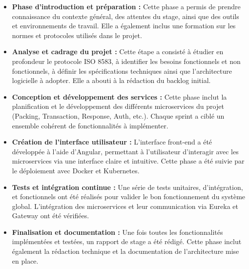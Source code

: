 \begin{itemize}[label=\textbullet]
    \item \textbf{Phase d’introduction et préparation :} Cette phase a permis de prendre connaissance du contexte général, des attentes du stage, ainsi que des outils et environnements de travail. Elle a également inclus une formation sur les normes et protocoles utilisés dans le projet.      
    \vspace{0.5cm}


    \item \textbf{Analyse et cadrage du projet :} Cette étape a consisté à étudier en profondeur le protocole ISO 8583, à identifier les besoins fonctionnels et non fonctionnels, à définir les spécifications techniques ainsi que l’architecture logicielle à adopter. Elle a abouti à la rédaction du backlog initial.
     \vspace{0.5cm}


    \item \textbf{Conception et développement des services :} Cette phase inclut la planification et le développement des différents microservices du projet (Packing, Transaction, Response, Auth, etc.). Chaque sprint a ciblé un ensemble cohérent de fonctionnalités à implémenter.
     \vspace{0.5cm}


    \item \textbf{Création de l'interface utilisateur :} L’interface front-end a été développée à l’aide d’Angular, permettant à l’utilisateur d’interagir avec les microservices via une interface claire et intuitive. Cette phase a été suivie par le déploiement avec Docker et Kubernetes.
    \vspace{0.5cm}


    \item \textbf{Tests et intégration continue :} Une série de tests unitaires, d’intégration, et fonctionnels ont été réalisés pour valider le bon fonctionnement du système global. L’intégration des microservices et leur communication via Eureka et Gateway ont été vérifiées.
    \vspace{0.5cm}


    \item \textbf{Finalisation et documentation :} Une fois toutes les fonctionnalités implémentées et testées, un rapport de stage a été rédigé. Cette phase inclut également la rédaction technique et la documentation de l’architecture mise en place.
\end{itemize}


